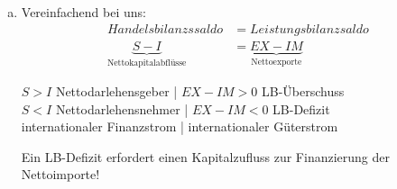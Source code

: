 \documentclass{scrartcl}
\begin{document}
\begin{enumerate}[a)]
\begin{itemize}
\end{itemize}
\item Vereinfachend bei uns:
\begin{align*}
  Handelsbilanzssaldo &= Leistungsbilanzsaldo\\
  \underbrace{S-I}_\text{Nettokapitalabfl\"{u}sse} &= \underbrace{EX-IM}_\text{Nettoexporte}
\end{align*}
\begin{center}
$S>I$ Nettodarlehensgeber | $EX-IM >0$ LB-\"{U}berschuss\\
$S<I$ Nettodarlehensnehmer | $EX-IM <0$ LB-Defizit\\
internationaler Finanzstrom | internationaler G\"{u}terstrom
\end{center}
Ein LB-Defizit erfordert einen Kapitalzufluss zur Finanzierung der Nettoimporte!
\end{enumerate}
\end{document}
